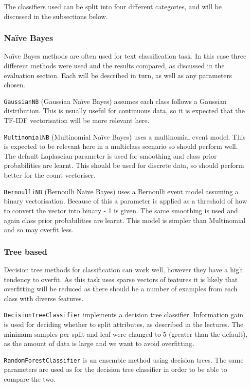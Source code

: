 \documentclass{article}
\begin{document}
The classifiers used can be split into four different categories, and will be discussed in the subsections below.

\subsubsection{Na{\"i}ve Bayes}
Na{\"i}ve Bayes methods are often used for text classification task. In this case three different methods were used and the results compared, as discussed in the evaluation section. Each will be described in turn, as well as any parameters chosen.

\verb|GaussianNB| (Gaussian Na{\"i}ve Bayes) assumes each class follows a Gaussian distribution. This is usually useful for continuous data, so it is expected that the TF-IDF vectorisation will be more relevant here.

\verb|MultinomialNB| (Multinomial Na{\"i}ve Bayes) uses a multinomial event model. This is expected to be relevant here in a multiclass scenario so should perform well. The default Laplascian parameter is used for smoothing and class prior probabilities are learnt. This should be used for discrete data, so should perform better for the count vectoriser.

\verb|BernoulliNB| (Bernoulli Na{\"i}ve Bayes) uses a Bernoulli event model assuming a binary vectorisation. Because of this a parameter is applied as a threshold of how to convert the vector into binary - 1 is given. The same smoothing is used and again class prior probabilities are learnt. This model is simpler than Multinomial and so may overfit less.

\subsubsection{Tree based}
Decision tree methods for classification can work well, however they have a high tendency to overfit. As this task uses sparse vectors of features it is likely that overfitting will be reduced as there should be a number of examples from each class with diverse features.

\verb|DecisionTreeClassifier| implements a decision tree classifier. Information gain is used for deciding whether to split attributes, as described in the lectures. The minimum samples per split and leaf were changed to 5 (greater than the default), as the amount of data is large and we want to avoid overfitting.

\verb|RandomForestClassifier| is an ensemble method using decision trees. The same parameters are used as for the decision tree classifier in order to be able to compare the two.
\end{document}
